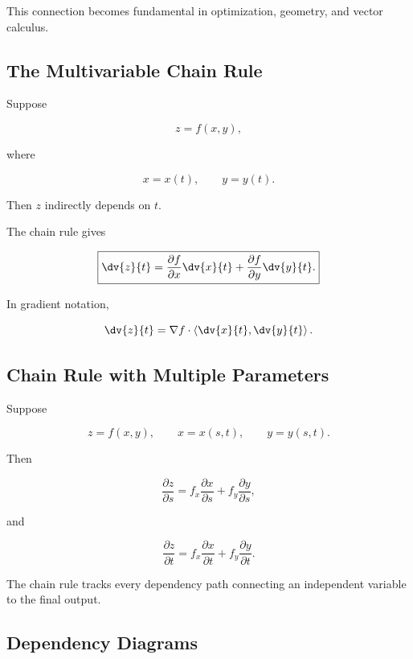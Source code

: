 This connection becomes fundamental in optimization, geometry, and vector
calculus.

\subsection{The Multivariable Chain Rule}
\label{subsec:multivariable-chain-rule}

Suppose

\[ z=f(x,y), \]

where

\[ x=x(t),\qquad y=y(t). \]

Then \(z\) indirectly depends on \(t\).

The chain rule gives

\[ \boxed{
\dv{z}{t}
=
\frac{\partial f}{\partial x}\dv{x}{t}
+
\frac{\partial f}{\partial y}\dv{y}{t}.
} \]

In gradient notation,

\[ \dv{z}{t}
=
\nabla f\cdot
\left\langle
\dv{x}{t},
\dv{y}{t}
\right\rangle.
\]

\subsection{Chain Rule with Multiple Parameters}
\label{subsec:chain-rule-multiple-parameters}

Suppose

\[ z=f(x,y),\qquad x=x(s,t),\qquad y=y(s,t). \]

Then

\[ \frac{\partial z}{\partial s}
=
f_x\frac{\partial x}{\partial s}
+
f_y\frac{\partial y}{\partial s}, \]

and

\[ \frac{\partial z}{\partial t}
=
f_x\frac{\partial x}{\partial t}
+
f_y\frac{\partial y}{\partial t}. \]

The chain rule tracks every dependency path connecting an independent
variable to the final output.

\subsection{Dependency Diagrams}
\label{subsec:dependency-diagrams}

